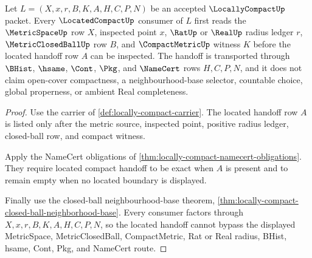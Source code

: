 \begin{theorem}
\label{thm:locally-compact-located-handoff-boundary}
Let $L=(X,x,r,B,K,A,H,C,P,N)$ be an accepted $\LocallyCompactUp$ packet. Every $\LocatedCompactUp$ consumer of $L$ first reads the $\MetricSpaceUp$ row $X$, inspected point $x$, $\RatUp$ or $\RealUp$ radius ledger $r$, $\MetricClosedBallUp$ row $B$, and $\CompactMetricUp$ witness $K$ before the located handoff row $A$ can be inspected. The handoff is transported through $\BHist$, $\hsame$, $\Cont$, $\Pkg$, and $\NameCert$ rows $H,C,P,N$, and it does not claim open-cover compactness, a neighbourhood-base selector, countable choice, global properness, or ambient Real completeness.
\end{theorem}
\begin{proof}
Use the carrier of \autoref{def:locally-compact-carrier}. The located handoff row $A$ is listed only after the metric source, inspected point, positive radius ledger, closed-ball row, and compact witness.

Apply the NameCert obligations of \autoref{thm:locally-compact-namecert-obligations}. They require located compact handoff to be exact when $A$ is present and to remain empty when no located boundary is displayed.

Finally use the closed-ball neighbourhood-base theorem, \autoref{thm:locally-compact-closed-ball-neighborhood-base}. Every consumer factors through $X,x,r,B,K,A,H,C,P,N$, so the located handoff cannot bypass the displayed MetricSpace, MetricClosedBall, CompactMetric, Rat or Real radius, BHist, hsame, Cont, Pkg, and NameCert route.
\end{proof}

